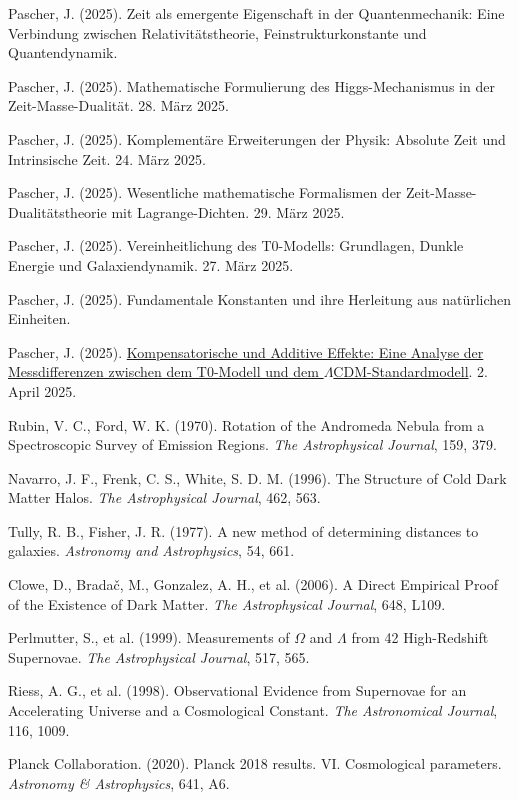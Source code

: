 \documentclass[a4paper,12pt]{article}
\newcommand{\repobase}{https://github.com/jpascher/T0-Time-Mass-Duality/tree/main/2/}
\begin{document}
	\begin{thebibliography}{99}
		
		 Pascher, J. (2025). Zeit als emergente Eigenschaft in der Quantenmechanik: Eine Verbindung zwischen Relativitätstheorie, Feinstrukturkonstante und Quantendynamik.
		
		 Pascher, J. (2025). Mathematische Formulierung des Higgs-Mechanismus in der Zeit-Masse-Dualität. 28. März 2025.
		
		 Pascher, J. (2025). Komplementäre Erweiterungen der Physik: Absolute Zeit und Intrinsische Zeit. 24. März 2025.
		
		 Pascher, J. (2025). Wesentliche mathematische Formalismen der Zeit-Masse-Dualitätstheorie mit Lagrange-Dichten. 29. März 2025.
		
		 Pascher, J. (2025). Vereinheitlichung des T0-Modells: Grundlagen, Dunkle Energie und Galaxiendynamik. 27. März 2025.
		
		 Pascher, J. (2025). Fundamentale Konstanten und ihre Herleitung aus natürlichen Einheiten.
		
		 Pascher, J. (2025). \href{\repobase/pdf/Deutsch/Analyse der Messdifferenzen zwischen dem T0-Modell und dem Standardmodell.pdf}{Kompensatorische und Additive Effekte: Eine Analyse der Messdifferenzen zwischen dem T0-Modell und dem $\Lambda$CDM-Standardmodell}. 2. April 2025.
		
		 Rubin, V. C., Ford, W. K. (1970). Rotation of the Andromeda Nebula from a Spectroscopic Survey of Emission Regions. \textit{The Astrophysical Journal}, 159, 379.
		
		 Navarro, J. F., Frenk, C. S., White, S. D. M. (1996). The Structure of Cold Dark Matter Halos. \textit{The Astrophysical Journal}, 462, 563.
		
		 Tully, R. B., Fisher, J. R. (1977). A new method of determining distances to galaxies. \textit{Astronomy and Astrophysics}, 54, 661.
		
		 Clowe, D., Bradač, M., Gonzalez, A. H., et al. (2006). A Direct Empirical Proof of the Existence of Dark Matter. \textit{The Astrophysical Journal}, 648, L109.
		
		 Perlmutter, S., et al. (1999). Measurements of $\Omega$ and $\Lambda$ from 42 High-Redshift Supernovae. \textit{The Astrophysical Journal}, 517, 565.
		
		 Riess, A. G., et al. (1998). Observational Evidence from Supernovae for an Accelerating Universe and a Cosmological Constant. \textit{The Astronomical Journal}, 116, 1009.
		
		 Planck Collaboration. (2020). Planck 2018 results. VI. Cosmological parameters. \textit{Astronomy \& Astrophysics}, 641, A6.
		
	\end{thebibliography}
	
\end{document}
